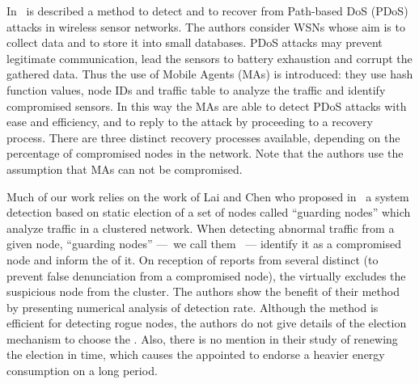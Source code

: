 In~\cite{LB09} is described a method to detect and to recover from Path-based DoS (PDoS) attacks in wireless sensor networks.
The authors consider WSNs whose aim is to collect data and to store it into small databases.
PDoS attacks may prevent legitimate communication, lead the sensors to battery exhaustion and corrupt the gathered data.
Thus the use of Mobile Agents (MAs) is introduced: they use hash function values, node IDs and traffic table to analyze the traffic and identify compromised sensors.
In this way the MAs are able to detect PDoS attacks with ease and efficiency, and to reply to the attack by proceeding to a recovery process.
There are three distinct recovery processes available, depending on the percentage of compromised nodes in the network.
Note that the authors use the assumption that MAs can not be compromised.

Much of our work relies on the work of Lai and Chen who proposed in~\cite{LC08} a system detection based on static election of a set of nodes called ``guarding nodes'' which analyze traffic in a clustered network.
When detecting abnormal traffic from a given node, ``guarding nodes'' ---~we call them \cns~--- identify it as a compromised node and inform the \ch of it.
On reception of reports from several distinct \cns (to prevent false denunciation from a compromised node), the \CH virtually excludes the suspicious node from the cluster.
The authors show the benefit of their method by presenting numerical analysis of detection rate.
Although the method is efficient for detecting rogue nodes, the authors do not give details of the election mechanism to choose the \cns.
Also, there is no mention in their study of renewing the election in time, which causes the appointed \cns to endorse a heavier energy consumption on a long period.








